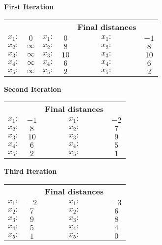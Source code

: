 \documentclass{article}
\begin{document}
\textbf{First Iteration}
	\begin{center}
		\begin{tabular}{c c |c c | c c}
						&		&		&	 &\textbf{Final distances}\\        
			    $x_1:$&$0$ & $x_1:$&$0$ & $x_1:$&$-1$ \\
                $x_2:$&$\infty$ & $x_2:$&$8$ & $x_2:$&$8$ \\
                $x_3:$&$\infty$ & $x_3:$&$10$ & $x_3:$&$10$\\
                $x_4:$&$\infty$ & $x_4:$&$6$ & $x_4:$&$6$\\
                $x_5:$&$\infty$ & $x_5:$&$2$ & $x_5:$&$2$\\
		\end{tabular}
	\end{center}
    
\textbf{Second Iteration}
	\begin{center}
		\begin{tabular}{c c |c c}
						&		&		\textbf{Final distances}\\        
			    $x_1:$&$-1$ & $x_1:$&$-2$ \\
                $x_2:$&$8$  & $x_2:$&$7$ \\
                $x_3:$&$10$  & $x_3:$&$9$\\
                $x_4:$&$6$  & $x_4:$&$5$\\
                $x_5:$&$2$  & $x_5:$&$1$\\
		\end{tabular}
	\end{center}
    
 \textbf{Third Iteration}
	\begin{center}
		\begin{tabular}{c c |c c}
						&		&		\textbf{Final distances}\\        
			    $x_1:$&$-2$ & $x_1:$&$-3$ \\
                $x_2:$&$7$  & $x_2:$&$6$ \\
                $x_3:$&$9$  & $x_3:$&$8$\\
                $x_4:$&$5$  & $x_4:$&$4$\\
                $x_5:$&$1$  & $x_5:$&$0$\\
		\end{tabular}
	\end{center}
    
\end{document}
